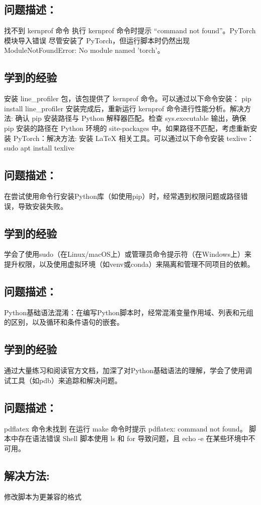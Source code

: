 \documentclass[a4paper, 12pt]{article}
\begin{document}
 \subsection{问题描述：}
 找不到 kernprof 命令
执行 kernprof 命令时提示 “command not found”。PyTorch 模块导入错误
尽管安装了 PyTorch，但运行脚本时仍然出现 ModuleNotFoundError: No module named 'torch'。
  \subsection{学到的经验}
安装 line\_profiler 包，该包提供了 kernprof 命令。可以通过以下命令安装：
pip install line\_profiler
安装完成后，重新运行 kernprof 命令进行性能分析。解决方法: 确认 pip 安装路径与 Python 解释器匹配。检查 sys.executable 输出，确保 pip 安装的路径在 Python 环境的 site-packages 中。如果路径不匹配，考虑重新安装 PyTorch：解决方法: 安装 LaTeX 相关工具。可以通过以下命令安装 texlive：
sudo apt install texlive
 \subsection{问题描述：}在尝试使用命令行安装Python库（如使用pip）时，经常遇到权限问题或路径错误，导致安装失败。
 \subsection{学到的经验}
  学会了使用sudo（在Linux/macOS上）或管理员命令提示符（在Windows上）来提升权限，以及使用虚拟环境（如venv或conda）来隔离和管理不同项目的依赖。
 \subsection{问题描述：}Python基础语法混淆：在编写Python脚本时，经常混淆变量作用域、列表和元组的区别，以及循环和条件语句的嵌套。
\subsection{学到的经验}通过大量练习和阅读官方文档，加深了对Python基础语法的理解，学会了使用调试工具（如pdb）来追踪和解决问题。

\subsection{问题描述：}
pdflatex 命令未找到
在运行 make 命令时提示 pdflatex: command not found。
脚本中存在语法错误
 Shell 脚本使用 ls 和 for 导致问题，且 echo -e 在某些环境中不可用。
\subsection{解决方法:}
 修改脚本为更兼容的格式
\end{document}
